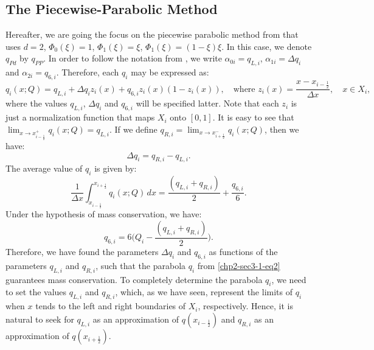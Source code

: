 \subsection{The Piecewise-Parabolic Method}
\label{chp2-sec-ppm}
Hereafter, we are going the focus on the piecewise parabolic method from \citet{colella:1984} that uses $d=2$, 
$\Phi_0(\xi)=1$, $\Phi_1(\xi)=\xi$, $\Phi_1(\xi)=(1-\xi)\xi$. 
In this case, we denote $q_{Pd}$ by $q_{PP}$.
In order to follow the notation from \citet{colella:1984},
we write $\alpha_{0i} = q_{L, i}$, $\alpha_{1i} = \Delta q_i$ and $\alpha_{2i} = q_{6, i}$.
Therefore, each $q_i$ may be expressed as:
\begin{equation}
	\label{chp2-sec-recon-ppm-eq1}
	q_i(x;Q) = q_{L, i} + \Delta q_i z_i(x) + q_{6, i}z_i(x)(1-z_i(x)), 
	\quad \text{where }
	z_i(x) = \frac{x-x_{i-\frac{1}{2}}}{\Delta x},
	\quad x \in X_i,
\end{equation}
where the values $q_{L, i}$, $\Delta q_i$ and $q_{6, i}$  will be specified latter.
Note that each $z_i$ is just a normalization function that maps $X_i$ onto $[0,1]$.
It is easy to see that 
$\lim_{x \to x_{i-\frac{1}{2}}^+} {q_i(x;Q)} = q_{L, i}$.
If we define $q_{R, i} = \lim_{x \to x_{i+\frac{1}{2}}^-} {q_i(x;Q)}$,
then we have:
\begin{equation}
	\label{chp2-sec-recon-ppm-eq2}
	\Delta q_i = q_{R, i} - q_{L, i}.
\end{equation}
The average value of $q_i$ is given by:
\begin{equation}
	\label{chp2-sec-recon-ppm-eq3}
	\frac{1}{\Delta x}\int_{x_{i-\frac{1}{2}}}^{x_{i+\frac{1}{2}}} {q}_i(x;Q) \,dx
	= \frac{(q_{L,i} + q_{R,i})}{2} + \frac{q_{6,i}}{6}.
\end{equation}
Under the hypothesis of mass conservation, we have:
\begin{equation}
	\label{chp2-sec-recon-ppm-eq4}
	q_{6,i} = 6\bigg(Q_i - \frac{(q_{L,i} + q_{R,i})}{2}\bigg).
\end{equation}
Therefore, we have found the parameters $\Delta q_i$ and $q_{6, i}$ as
functions of the parameters $q_{L, i}$ and $q_{R, i}$,
such that the parabola $q_i$ from \eqref{chp2-sec3-1-eq2} 
guarantees mass conservation. To completely determine the 
parabola $q_i$, we need to set the values $q_{L, i}$ and
$q_{R, i}$, which, as we have seen, represent the limits of $q_i$ when
$x$ tends to the left and right boundaries of $X_i$, respectively.
Hence, it is natural to seek for $q_{L, i}$ as an approximation of $q(x_{i-\frac{1}{2}})$
and $q_{R, i}$ as an approximation of $q(x_{i+\frac{1}{2}})$.
